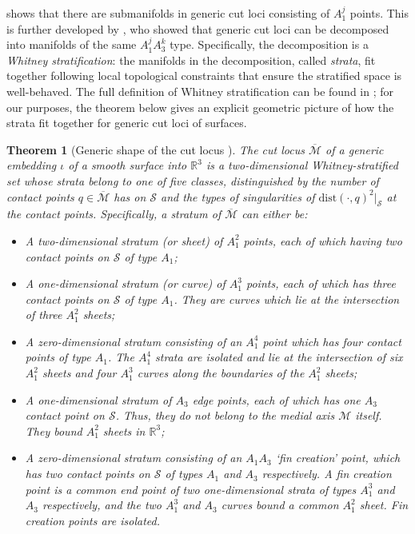 \documentclass[11pt]{article}
\newcommand{\R}{\mathbb{R}}
\newcommand{\dist}{\mathrm{dist}}
\newcommand{\med}{\mathcal{M}}
\newcommand{\Surf}{\mathcal{S}}
\theoremstyle{plain}
\newtheorem{thm}{Theorem}
\theoremstyle{definition}
\theoremstyle{remark}
\begin{document}
	 shows that there are submanifolds in generic cut loci consisting of $A_1^j$ points. This is further developed by \cite{mather_distance_1983}, who showed that generic cut loci can be decomposed into manifolds of the same $A_1^jA_3^k$ type. Specifically, the decomposition is a \emph{Whitney stratification}: the manifolds in the decomposition, called \emph{strata}, fit together following local topological constraints that ensure the stratified space is well-behaved. The full definition of Whitney stratification can be found in  \cite{goresky_stratified_1988}; for our purposes, the theorem below gives an explicit geometric picture of how the strata fit together for generic cut loci of surfaces.
	
	\begin{thm}[Generic shape of the cut locus \citep{mather_distance_1983, giblin_symmetry_2000, cazals_differential_2005, damon_global_2006}]
		\label{thm:generic_cut_locus}
		The cut locus $\overline{\med}$ of a generic embedding $\iota$ of a smooth surface into $\R^3$ is a two-dimensional Whitney-stratified set whose strata belong to one of five classes, distinguished by the number of contact points $q \in \overline{\med}$ has on $\Surf$ and the types of singularities of $\dist(\cdot, q)^2\rvert_\Surf$ at the contact points. Specifically, a stratum of $\overline{\med}$ can either be:
		\begin{itemize}
			\item A two-dimensional stratum (or sheet) of $A_1^2$ points, each of which having two contact points on $\Surf$ of type $A_1$;
			\item A one-dimensional stratum (or curve) of $A_1^3$ points, each of which has three contact points on $\Surf$ of type $A_1$. They are curves which lie at the intersection of three $A_1^2$ sheets; 
			\item A zero-dimensional stratum consisting of an $A_1^4$ point which has four contact points of type $A_1$. The $A_1^4$ strata are isolated and lie at the intersection of six $A_1^2$ sheets and four $A_1^3$ curves along the boundaries of the $A_1^2$ sheets;
			\item A one-dimensional stratum of $A_3$ edge points, each of which has one $A_3$ contact point on $\Surf$. Thus, they do not belong to the medial axis $\mathcal{M}$ itself. They bound $A_1^2$ sheets in $\R^3$;
			\item A zero-dimensional stratum consisting of an $A_1 A_3$ `\emph{fin creation}' point, which has two contact points on $\Surf$ of types $A_1$ and $A_3$ respectively. A fin creation point is a common end point of two one-dimensional strata of types $A_1^3$ and $A_3$ respectively, and the two $A_1^3$ and $A_3$ curves bound a common $A_1^2$ sheet. Fin creation points are isolated.
		\end{itemize}
	\end{thm}
	
\end{document}
